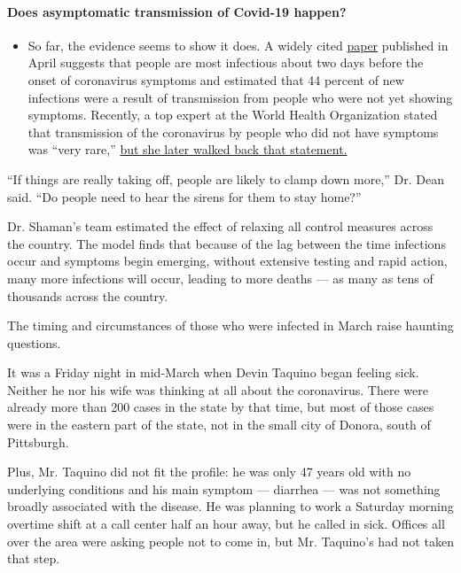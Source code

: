 \begin{itemize}
{  \paragraph{Does asymptomatic transmission of Covid-19
  happen?}\label{does-asymptomatic-transmission-of-covid-19-happen}}

  \begin{itemize}
  \tightlist
  \item
    So far, the evidence seems to show it does. A widely cited
    \href{https://www.nature.com/articles/s41591-020-0869-5}{paper}
    published in April suggests that people are most infectious about
    two days before the onset of coronavirus symptoms and estimated that
    44 percent of new infections were a result of transmission from
    people who were not yet showing symptoms. Recently, a top expert at
    the World Health Organization stated that transmission of the
    coronavirus by people who did not have symptoms was ``very rare,''
    \href{https://www.nytimes.com/2020/06/09/world/coronavirus-updates.html?action=click\&pgtype=Article\&state=default\&region=MAIN_CONTENT_3\&context=storylines_faq\#link-1f302e21}{but
    she later walked back that statement.}
  \end{itemize}
\end{itemize}

``If things are really taking off, people are likely to clamp down
more,'' Dr. Dean said. ``Do people need to hear the sirens for them to
stay home?''

Dr. Shaman's team estimated the effect of relaxing all control measures
across the country. The model finds that because of the lag between the
time infections occur and symptoms begin emerging, without extensive
testing and rapid action, many more infections will occur, leading to
more deaths --- as many as tens of thousands across the country.

The timing and circumstances of those who were infected in March raise
haunting questions.

It was a Friday night in mid-March when Devin Taquino began feeling
sick. Neither he nor his wife was thinking at all about the coronavirus.
There were already more than 200 cases in the state by that time, but
most of those cases were in the eastern part of the state, not in the
small city of Donora, south of Pittsburgh.

Plus, Mr. Taquino did not fit the profile: he was only 47 years old with
no underlying conditions and his main symptom --- diarrhea --- was not
something broadly associated with the disease. He was planning to work a
Saturday morning overtime shift at a call center half an hour away, but
he called in sick. Offices all over the area were asking people not to
come in, but Mr. Taquino's had not taken that step.

